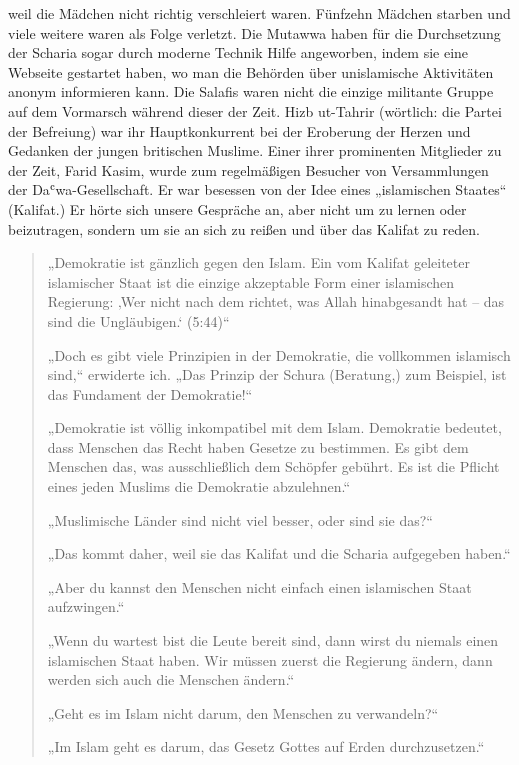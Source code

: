 \documentclass[12pt]{memoir}
\def\`{ʿ} %
\def\–{\hskip0pt-\hskip0pt}
\newcommand{\QRef}[1]{{\color{darkblue}#1}}
\begin{document}
weil die Mädchen nicht richtig verschleiert waren.
Fünfzehn Mädchen starben und viele weitere waren als Folge verletzt.
Die Mutawwa haben für die Durchsetzung der Scharia
sogar durch moderne Technik Hilfe angeworben,
indem sie eine Webseite gestartet haben,
wo man die Behörden über unislamische Aktivitäten anonym informieren kann.
Die Salafis waren nicht die einzige militante Gruppe
auf dem Vormarsch während dieser der Zeit.
Hizb ut\–Tahrir (wörtlich: die Partei der Befreiung)
war ihr Hauptkonkurrent bei der Eroberung der Herzen und Gedanken
der jungen britischen Muslime.
Einer ihrer prominenten Mitglieder zu der Zeit, Farid Kasim,
wurde zum regelmäßigen Besucher von Versammlungen der Da\`wa\–Gesellschaft.
Er war besessen von der Idee eines „islamischen Staates“ (Kalifat.)
Er hörte sich unsere Gespräche an, aber nicht um zu lernen oder beizutragen,
sondern um sie an sich zu reißen und über das Kalifat zu reden.

\begin{quote}
„Demokratie ist gänzlich gegen den Islam.
Ein vom Kalifat geleiteter islamischer Staat
ist die einzige akzeptable Form einer islamischen Regierung:
‚Wer nicht nach dem richtet, was Allah hinabgesandt hat –
das sind die Ungläubigen.‘ (\QRef{5:44})“

„Doch es gibt viele Prinzipien in der Demokratie,
die vollkommen islamisch sind,“ erwiderte ich.
„Das Prinzip der Schura (Beratung,) zum Beispiel,
ist das Fundament der Demokratie!“

„Demokratie ist völlig inkompatibel mit dem Islam.
Demokratie bedeutet, dass Menschen das Recht haben Gesetze zu bestimmen.
Es gibt dem Menschen das, was ausschließlich dem Schöpfer gebührt.
Es ist die Pflicht eines jeden Muslims die Demokratie abzulehnen.“

„Muslimische Länder sind nicht viel besser, oder sind sie das?“

„Das kommt daher, weil sie das Kalifat und die Scharia aufgegeben haben.“

„Aber du kannst den Menschen nicht einfach
einen islamischen Staat aufzwingen.“

„Wenn du wartest bist die Leute bereit sind,
dann wirst du niemals einen islamischen Staat haben.
Wir müssen zuerst die Regierung ändern,
dann werden sich auch die Menschen ändern.“

„Geht es im Islam nicht darum, den Menschen zu verwandeln?“

„Im Islam geht es darum, das Gesetz Gottes auf Erden durchzusetzen.“
\end{quote}
\end{document}
